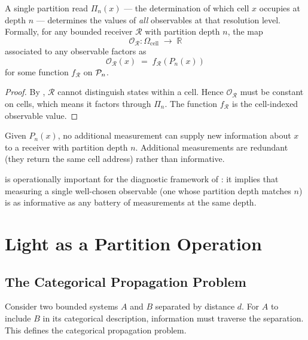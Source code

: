 \begin{theorem}
\label{thm:obs-identity}
A single partition read $\Pi_n(x)$ --- the determination of which cell $x$
occupies at depth $n$ --- determines the values of \emph{all} observables at
that resolution level.  Formally, for any bounded receiver $\mathcal{R}$
with partition depth $n$, the map
\[
    \mathcal{O}_\mathcal{R} : \Omega_\mathrm{cell} \;\to\; \mathbb{R}
\]
associated to any observable factors as
\[
    \mathcal{O}_\mathcal{R}(x) \;=\; f_\mathcal{R}(P_n(x))
\]
for some function $f_\mathcal{R}$ on $\mathcal{P}_n$.
\end{theorem}

\begin{proof}
By , $\mathcal{R}$ cannot distinguish states within a
cell.  Hence $\mathcal{O}_\mathcal{R}$ must be constant on cells, which means
it factors through $\Pi_n$.  The function $f_\mathcal{R}$ is the
cell-indexed observable value.
\end{proof}

\begin{corollary}
\label{cor:single-read}
Given $P_n(x)$, no additional measurement can supply new information about $x$
to a receiver with partition depth $n$.  Additional measurements are redundant
(they return the same cell address) rather than informative.
\end{corollary}

 is operationally important for the diagnostic framework
of : it implies that measuring a single
well-chosen observable (one whose partition depth matches $n$) is as informative
as any battery of measurements at the same depth.

\section{Light as a Partition Operation}
\label{sec:light}

\subsection{The Categorical Propagation Problem}

Consider two bounded systems $A$ and $B$ separated by distance $d$.  For $A$
to include $B$ in its categorical description, information must traverse the
separation.  This defines the categorical propagation problem.

